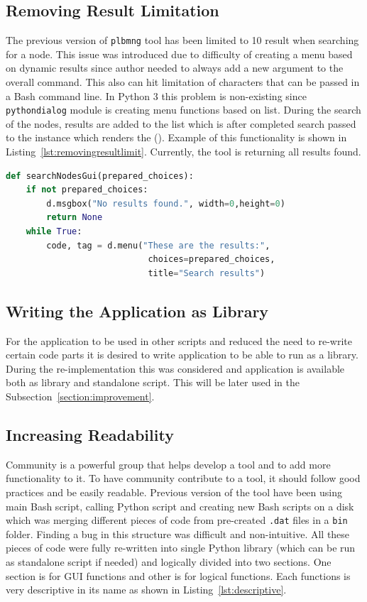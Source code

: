\subsection{Removing Result Limitation}
The previous version of \texttt{plbmng} tool has been limited to 10 result when searching for a node. This issue was introduced due to difficulty of creating a menu based on dynamic results since author needed to always add a new argument to the overall command. This also can hit limitation of characters that can be passed in a Bash command line. In Python 3 this problem is non-existing since \texttt{pythondialog} module is creating menu functions based on list. During the search of the nodes, results are added to the list which is after completed search passed to the instance which renders the  (). Example of this functionality is shown in Listing~\ref{lst:removingresultlimit}. Currently, the tool is returning all results found.
\begin{minipage}{\linewidth}
\begin{lstlisting}[language=Python, numbers=none, label={lst:removingresultlimit}, caption=Removing Result Limitation, frame=single, showstringspaces=false]
def searchNodesGui(prepared_choices):
	if not prepared_choices:
		d.msgbox("No results found.", width=0,height=0)
		return None
	while True:
		code, tag = d.menu("These are the results:",
							choices=prepared_choices,
							title="Search results")
\end{lstlisting}
\end{minipage}
\subsection{Writing the Application as Library}
For the application to be used in other scripts and reduced the need to re-write certain code parts it is desired to write application to be able to run as a library. During the re-implementation this was considered and application is available both as library and standalone script. This will be later used in the Subsection~\ref{section:improvement}.
\subsection{Increasing Readability}
\label{subsection:readability}
Community is a powerful group that helps develop a tool and to add more functionality to it. To have community contribute to a tool, it should follow good practices and be easily readable. Previous version of the tool have been using main Bash script, calling Python script and creating new Bash scripts on a disk which was merging different pieces of code from pre-created \texttt{.dat} files in a \texttt{bin} folder. Finding a bug in this structure was difficult and non-intuitive. All these pieces of code were fully re-written into single Python library (which can be run as standalone script if needed) and logically divided into two sections. One section is for GUI functions and other is for logical functions. Each functions is very descriptive in its name as shown in Listing~\ref{lst:descriptive}. 

